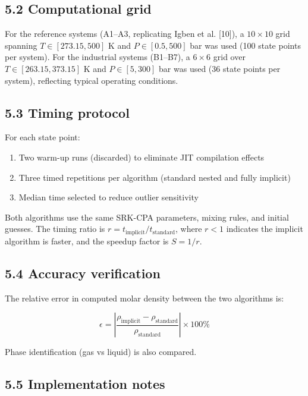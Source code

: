 \documentclass[review,3p]{elsarticle}
\begin{document}
\subsection{5.2 Computational grid}

For the reference systems (A1–A3, replicating Igben et al. [10]), a $10 \times 10$ grid spanning $T \in [273.15, 500]$ K and $P \in [0.5, 500]$ bar was used (100 state points per system). For the industrial systems (B1–B7), a $6 \times 6$ grid over $T \in [263.15, 373.15]$ K and $P \in [5, 300]$ bar was used (36 state points per system), reflecting typical operating conditions.

\subsection{5.3 Timing protocol}

For each state point:

\begin{enumerate}
  \item Two warm-up runs (discarded) to eliminate JIT compilation effects
  \item Three timed repetitions per algorithm (standard nested and fully implicit)
  \item Median time selected to reduce outlier sensitivity
\end{enumerate}

Both algorithms use the same SRK-CPA parameters, mixing rules, and initial guesses. The timing ratio is $r = t_{\text{implicit}} / t_{\text{standard}}$, where $r < 1$ indicates the implicit algorithm is faster, and the speedup factor is $S = 1/r$.

\subsection{5.4 Accuracy verification}

The relative error in computed molar density between the two algorithms is:

\begin{equation}

\epsilon = \left| \frac{\rho_{\text{implicit}} - \rho_{\text{standard}}}{\rho_{\text{standard}}} \right| \times 100\%

\end{equation}

Phase identification (gas vs liquid) is also compared.

\subsection{5.5 Implementation notes}
\end{document}
